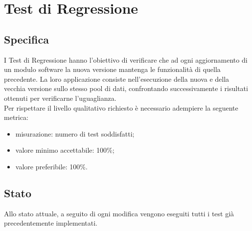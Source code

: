 \section{Test di Regressione}

	\subsection{Specifica}
		I Test di Regressione hanno l'obiettivo di verificare che ad ogni aggiornamento di un modulo software la nuova versione mantenga le funzionalità di quella precedente.
		La loro applicazione consiste nell'esecuzione della nuova e della vecchia versione sullo stesso pool di dati, confrontando successivamente i risultati ottenuti per verificarne l'uguaglianza.\\
		Per rispettare il livello qualitativo richiesto è necessario adempiere la seguente metrica:
		\begin{itemize}
			\item misurazione: numero di test soddisfatti;
			\item valore minimo accettabile: 100\%;
			\item valore preferibile: 100\%.
		\end{itemize}
	
	
	\subsection{Stato}
		Allo stato attuale, a seguito di ogni modifica vengono eseguiti tutti i test già precedentemente implementati.
